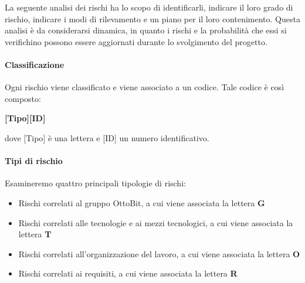 La seguente analisi dei rischi ha lo scopo di identificarli, indicare il loro grado di rischio, indicare i modi di rilevamento e un piano per il loro contenimento. Questa analisi è da considerarsi dinamica, in quanto i rischi e la probabilità che essi si verifichino possono essere aggiornati durante lo svolgimento del progetto.
\paragraph*{Classificazione\\} Ogni rischio viene classificato e viene associato a un codice. Tale codice è così composto:
	\begin{center}
		\textbf{[Tipo][ID]}
	\end{center}
dove [Tipo] è una lettera e [ID] un numero identificativo.
\paragraph*{Tipi di rischio\\} Esamineremo quattro principali tipologie di rischi:
	\begin{itemize}
		\item Rischi correlati al gruppo OttoBit, a cui viene associata la lettera \textbf{G}
		\item Rischi correlati alle tecnologie e ai mezzi tecnologici, a cui viene associata la lettera \textbf{T}
		\item Rischi correlati all'organizzazione del lavoro, a cui viene associata la lettera \textbf{O}
		\item Rischi correlati ai requisiti, a cui viene associata la lettera \textbf{R}
	\end{itemize}
	

